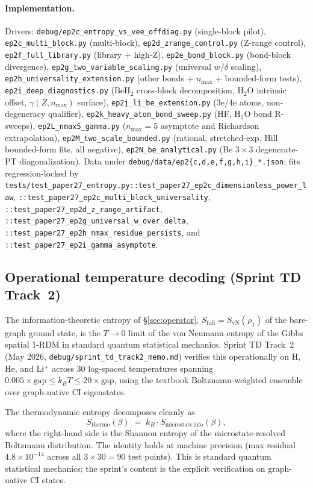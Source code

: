 \documentclass[twocolumn,pra,amsmath,amssymb,superscriptaddress]{revtex4-2}
\begin{document}
\paragraph*{Implementation.}  Drivers:
\texttt{debug/ep2c\_entropy\_vs\_vee\_offdiag.py} (single-block
pilot), \texttt{ep2c\_multi\_block.py} (multi-block),
\texttt{ep2d\_zrange\_control.py} (Z-range control),
\texttt{ep2f\_full\_library.py} (library + high-Z),
\texttt{ep2e\_bond\_block.py} (bond-block divergence),
\texttt{ep2g\_two\_variable\_scaling.py} (universal $w/\delta$
scaling), \texttt{ep2h\_universality\_extension.py} (other
bonds + $n_{\max}$ + bounded-form tests),
\texttt{ep2i\_deep\_diagnostics.py} (BeH$_2$ cross-block
decomposition, H$_2$O intrinsic offset,
$\gamma(Z,n_{\max})$ surface),
\texttt{ep2j\_li\_be\_extension.py} (3e/4e atoms,
non-degeneracy qualifier),
\texttt{ep2k\_heavy\_atom\_bond\_sweep.py} (HF, H$_2$O bond
R-sweeps), \texttt{ep2L\_nmax5\_gamma.py} ($n_{\max}=5$
asymptote and Richardson extrapolation),
\texttt{ep2M\_two\_scale\_bounded.py} (rational, stretched-exp,
Hill bounded-form fits, all negative),
\texttt{ep2N\_be\_analytical.py} (Be $3\times 3$
degenerate-PT diagonalization).  Data under
\texttt{debug/data/ep2\{c,d,e,f,g,h,i\}\_*.json}; fits
regression-locked by
\texttt{tests/test\_paper27\_entropy.py::test\_paper27\_ep2c\_dimensionless\_power\_law},
\texttt{::test\_paper27\_ep2c\_multi\_block\_universality},
\texttt{::test\_paper27\_ep2d\_z\_range\_artifact},
\texttt{::test\_paper27\_ep2g\_universal\_w\_over\_delta},
\texttt{::test\_paper27\_ep2h\_nmax\_residue\_persists},
and
\texttt{::test\_paper27\_ep2i\_gamma\_asymptote}.


\subsection{Operational temperature decoding (Sprint TD Track~2)}
\label{sec:operational_temp_decoding}

The information-theoretic entropy of \S\ref{sec:operator},
$S_{\mathrm{full}} = S_{\mathrm{vN}}(\rho_1)$ of the bare-graph
ground state, is the $T \to 0$ limit of the von Neumann entropy of
the Gibbs spatial 1-RDM in standard quantum statistical mechanics.
Sprint TD Track~2 (May 2026,
\verb|debug/sprint_td_track2_memo.md|) verifies this operationally on
H, He, and Li$^+$ across 30 log-spaced temperatures spanning
$0.005\times\mathrm{gap} \leq k_B T \leq 20\times\mathrm{gap}$, using
the textbook Boltzmann-weighted ensemble over graph-native CI
eigenstates.

The thermodynamic entropy decomposes cleanly as
\begin{equation}
\label{eq:apparatus_identity}
S_{\mathrm{thermo}}(\beta) \;=\; k_B \cdot S_{\mathrm{microstate\,info}}(\beta),
\end{equation}
where the right-hand side is the Shannon entropy of the
microstate-resolved Boltzmann distribution.  The identity holds at
machine precision (max residual $4.8\times 10^{-14}$ across all
$3\times 30 = 90$ test points).  This is standard quantum statistical
mechanics; the sprint's content is the explicit verification on
graph-native CI states.
\end{document}
